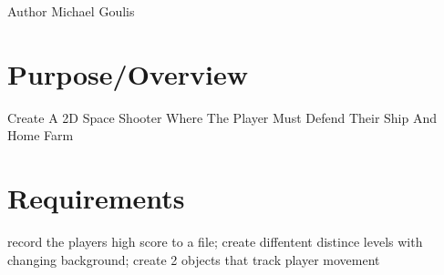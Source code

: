 \begin{DoxyAuthor}{\-Author}
\-Michael \-Goulis 
\end{DoxyAuthor}
\hypertarget{index_purpose}{}\section{\-Purpose/\-Overview}\label{index_purpose}
\-Create \-A 2\-D \-Space \-Shooter \-Where \-The \-Player \-Must \-Defend \-Their \-Ship \-And \-Home \-Farm\hypertarget{index_requirements}{}\section{\-Requirements}\label{index_requirements}
record the players high score to a file; create diffentent distince levels with changing background; create 2 objects that track player movement 